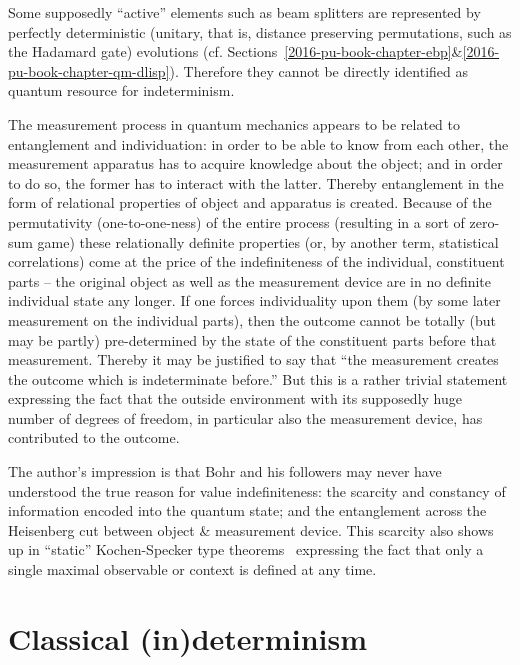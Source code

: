 Some supposedly ``active'' elements such as beam splitters are represented
by perfectly deterministic (unitary, that is, distance preserving permutations, such as the Hadamard gate) evolutions
(cf. Sections~\ref{2016-pu-book-chapter-ebp}{\&}\ref{2016-pu-book-chapter-qm-dlisp}).
Therefore they cannot be directly identified as quantum resource for indeterminism.


The measurement process in quantum mechanics appears to be related to entanglement and individuation:
in order to be able to know from each other, the measurement apparatus has to acquire knowledge
about the object; and  in order to do so, the former has to interact with the latter.
Thereby entanglement in the form of relational properties of object and apparatus is created.
Because of the permutativity (one-to-one-ness) of the entire process (resulting in a sort of zero-sum game)   
these relationally definite properties (or, by another term, statistical correlations)
come at the price of the indefiniteness of  the individual, constituent parts -- the original object as well as the measurement device are in no definite individual state any longer.
If one forces individuality upon them (by some later measurement on the individual parts),
then the outcome cannot be totally (but may be partly) pre-determined by the state of the constituent parts
before that measurement.
Thereby it may be justified to say that ``the measurement creates the outcome which is indeterminate before.''
But this is a rather trivial statement expressing the fact that the outside environment
with its supposedly huge number of degrees of freedom, in particular also the measurement device,
has contributed to the outcome.

The author's impression is that Bohr and his followers may never have understood the true reason for value indefiniteness:
the scarcity and constancy of information encoded into the quantum state; and the entanglement across the Heisenberg cut between object \& measurement device.
This scarcity also shows up in ``static'' Kochen-Specker type theorems~\cite{kochen1,pitowsky:218,2015-AnalyticKS}
expressing the fact that only a single maximal observable or context is defined at any time.

\section{Classical (in)determinism}

